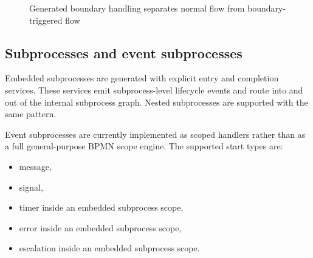 \begin{figure}[!ht]
    \centering
    \caption{Generated boundary handling separates normal flow from boundary-triggered flow}
    \label{fig:DurgaBoundaryBehavior}
\end{figure}

\subsection{Subprocesses and event subprocesses}

Embedded subprocesses are generated with explicit entry and completion services. These services emit subprocess-level lifecycle events and route into and out of the internal subprocess graph. Nested subprocesses are supported with the same pattern.

Event subprocesses are currently implemented as scoped handlers rather than as a full general-purpose BPMN scope engine. The supported start types are:
\begin{itemize}
\item message,
\item signal,
\item timer inside an embedded subprocess scope,
\item error inside an embedded subprocess scope,
\item escalation inside an embedded subprocess scope.
\end{itemize}


